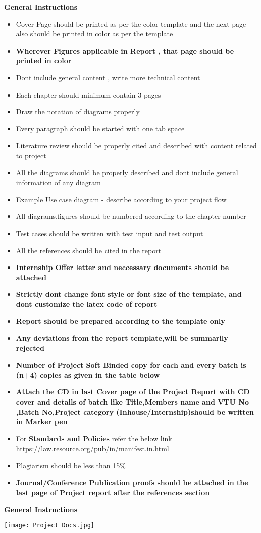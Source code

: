 \documentclass[10pt]{report}
\begin{document}
\begin{center} \textbf{General Instructions} \end{center} 
\begin{itemize}
\item Cover Page should be printed as per the color template and the next page also should be printed in color as per the template
\item \textbf {Wherever Figures applicable in Report , that page should be printed in color}

\item Dont include general content , write more technical content


\item Each chapter should minimum contain 3 pages
\item Draw the notation of diagrams properly 

\item Every paragraph should be started with one tab space 
\item Literature review should be properly cited and described with content related to project
\item All the diagrams should be properly described and dont include general information of any diagram
\item Example Use case diagram - describe according to your project flow
\item All diagrams,figures should be numbered according to the chapter number
\item Test cases should be written with test input and test output
\item All the references should be cited in the report 
\item \textbf{Internship Offer letter and neccessary documents should be attached}
\item \textbf{Strictly dont change font style or font size of the template, and dont customize the latex code of report}
\item \textbf{Report should be prepared according to the template only}
\item \textbf{Any deviations from the report template,will be summarily rejected}
\item \textbf{ Number of Project Soft Binded copy for each and every batch is (n+4) copies as given in the table below}
\item \textbf {Attach the CD in last Cover page of the Project Report with CD cover and details of batch like Title,Members name and VTU No ,Batch No,Project category (Inhouse/Internship)should be written in Marker pen}



\item For \textbf{Standards and Policies} refer the below link \\
https://law.resource.org/pub/in/manifest.in.html

\item Plagiarism should be less than 15\% 
\item  \textbf {Journal/Conference Publication proofs should be attached in the last page of Project report after the references section}
\end{itemize}

\newpage
\begin{center} \textbf{General Instructions} \end{center} 
\texttt{[image: Project Docs.jpg]}\\
\end{document}
